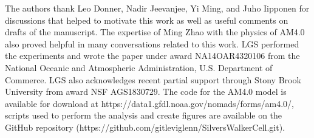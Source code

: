 \documentclass[draft]{agujournal2019}
\begin{document}
{%
%
%
%
\acknowledgments
The authors thank Leo Donner, Nadir Jeevanjee, Yi Ming, and Juho Iipponen for discussions  that helped to motivate this work as well as useful comments on drafts of the manuscript.  The expertise of Ming Zhao with the physics of AM4.0 also proved helpful in many conversations related to this work.  LGS performed the experiments and wrote the paper under award NA14OAR4320106 from the National Oceanic and Atmospheric Administration, U.S. Department of Commerce.  LGS also acknowledges recent partial support through Stony Brook University from award NSF AGS1830729.  The code for the AM4.0 model is available for download at  https://data1.gfdl.noaa.gov/nomads/forms/am4.0/, scripts used to perform the analysis and create figures are available on the GitHub repository (https://github.com/gitleviglenn/SilversWalkerCell.git).

}
\end{document}
